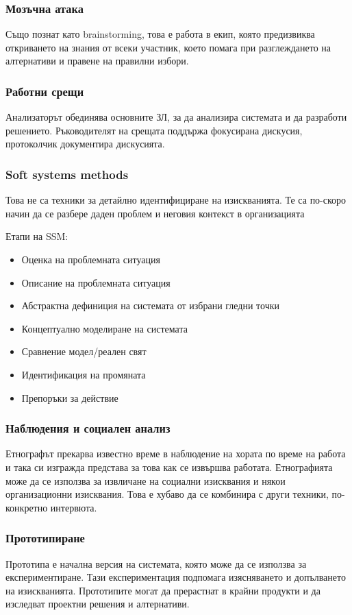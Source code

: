 \documentclass[fleqn,12pt]{article}
\begin{document}
\subsubsection{Мозъчна атака}
Също познат като brainstorming, това е работа в екип, която предизвиква откриването на знания от всеки участник, което помага при разглеждането на алтернативи и правене на правилни избори.

\subsubsection{Работни срещи}
Анализаторът обединява основните ЗЛ, за да анализира системата и да разработи решението. Ръководителят на срещата поддържа фокусирана дискусия, протоколчик документира дискусията.

\subsubsection{Soft systems methods}
Това не са техники за детайлно идентифициране на изискванията. Те са по-скоро начин да се разбере даден проблем и неговия контекст в организацията

 Етапи на SSM:
\begin{itemize}
	\item Оценка на проблемната ситуация
	\item Описание на проблемната ситуация
	\item Абстрактна дефиниция на системата от избрани гледни точки
	\item Концептуално моделиране на системата
	\item Сравнение модел/реален свят
	\item Идентификация на промяната
	\item Препоръки за действие
\end{itemize}

\subsubsection{Наблюдения и социален анализ}
Етнографът прекарва известно време в наблюдение на хората по време на работа и така си изгражда представа за това как се извършва работата. Етнографията може да се използва за извличане на социални изисквания и някои организационни изисквания. Това е хубаво да се комбинира с други техники, по-конкретно интервюта.

\subsubsection{Прототипиране}
Прототипа е начална версия на системата, която може да се използва за експериментиране. Тази експериментация подпомага изясняването и допълването на изискванията. Прототипите могат да прерастнат в крайни продукти и да изследват проектни решения и алтернативи.
\end{document}
